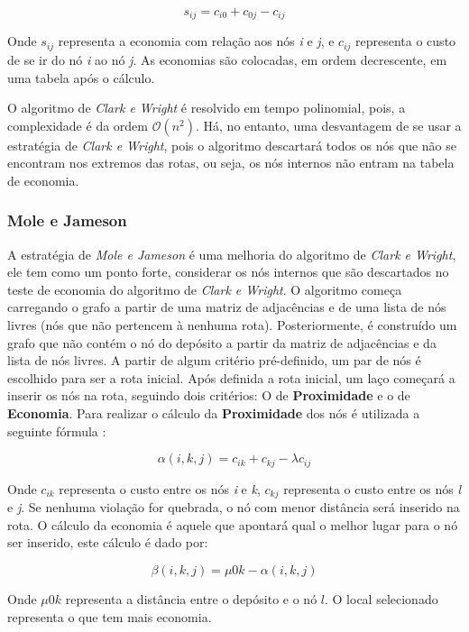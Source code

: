 \[ s_{ij} = c_{i0} + c_{0j} - c_{ij} \]

Onde $s_{ij}$ representa a economia com relação aos nós \emph{i} e \emph{j}, e $c_{ij}$ representa o custo de se ir do nó \emph{i} ao nó \emph{j}. As economias são colocadas, em ordem decrescente, em uma tabela após o cálculo. 

O algoritmo de \emph{Clark e Wright} é resolvido em tempo polinomial, pois, a complexidade é da ordem $\mathcal{O}(n^2)$. Há, no entanto, uma desvantagem de se usar a estratégia de \emph{Clark e Wright}, pois o algoritmo descartará todos os nós que não se encontram nos extremos das rotas, ou seja, os nós internos não entram na tabela de economia.

\subsubsection{Mole e Jameson}

A estratégia de \emph{Mole e Jameson} é uma melhoria do algoritmo de \emph{Clark e Wright}, ele tem como um ponto forte, considerar os nós internos que são descartados no teste de economia do algoritmo de \emph{Clark e Wright}. O algoritmo começa carregando o grafo a partir de uma matriz de adjacências e de uma lista de nós livres (nós que não pertencem à nenhuma rota). Posteriormente, é construído um grafo que não contém o nó do depósito a partir da matriz de adjacências e da lista de nós livres. A partir de algum critério pré-definido, um par de nós é escolhido para ser a rota inicial. Após definida a rota inicial, um laço começará a inserir os nós na rota, seguindo dois critérios: O de \textbf{Proximidade} e o de \textbf{Economia}.
Para realizar o cálculo da \textbf{Proximidade} dos nós é utilizada a seguinte fórmula \cite[p. 33]{maxwell}:

\[\alpha(i, k, j) = c_{ik} + c_{kj} - \lambda c_{ij} \]

Onde $c_{ik}$ representa o custo entre os nós \emph{i} e \emph{k}, $c_{kj}$  representa o custo entre os nós \emph{l} e \emph{j}. Se nenhuma violação for quebrada, o nó com menor distância será inserido na rota. O cálculo da economia é aquele que apontará qual o melhor lugar para o nó ser inserido, este cálculo é dado por:

\[\beta(i, k, j) = \mu 0k - \alpha(i, k, j) \]


Onde \(\mu 0k\) representa a distância entre o depósito e o nó $l$. O local selecionado representa o que tem mais economia.


